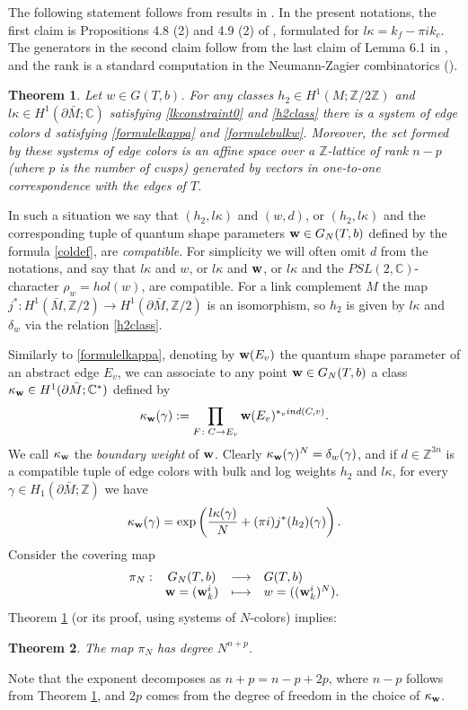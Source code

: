 \documentclass[11pt]{amsart}
\newtheorem{teo}{Theorem}[section]
\newcommand{\fonc}[5]{                     %
            \begin{array}{lcll}#1 :& #2 & \longrightarrow & #3 \\   %
                         &#4 &\longmapsto & #5          %
            \end{array}}
\newcommand{\mc}{\mathbb{C}}
\newcommand{\mz}{\mathbb{Z}}
\newcommand{\Z}{\mathbb{Z}}
\newcommand{\bw}{{\bf w}}
\newcommand{\ra}{\rightarrow}
\begin{document}
The following statement follows from results in  \cite{N0,N}. In the present notations, the first claim is Propositions 4.8 (2) and 4.9 (2) of \cite{AGT}, formulated for $l\kappa= k_f-\pi ik_c$. The generators in the second claim follow from the last claim of Lemma 6.1 in \cite{N0}, and the rank is a standard computation in the Neumann-Zagier combinatorics (\cite{NZ}). 
\begin{teo}\label{spaced} Let $w\in G(T,b)$. For any classes $h_2\in H^1(M;\mz/2\mz)$ and $l\kappa\in H^1(\partial \bar M; \mc)$ satisfying \eqref{lkconstraint0} and \eqref{h2class} there is a system of edge colors $d$ satisfying \eqref{formulelkappa} and \eqref{formulebulkw}. Moreover, the set formed by these systems of edge colors is an affine space over a $\mz$-lattice of rank $n-p$ (where $p$ is the number of cusps) generated by vectors in one-to-one correspondence with the edges of $T$.
\end{teo}
In such a situation we say that $(h_2, l\kappa)$ and $(w,d)$, or $(h_2, l\kappa)$ and the corresponding tuple of quantum shape parameters $\bw\in G_N(T,b)$ defined by the formula \eqref{coldef}, are {\it compatible}. For simplicity we will often omit $d$ from the notations, and say that $l\kappa$ and $w$, or $l\kappa$ and $\bw$, or $l\kappa$ and the $PSL(2,\mc)$-character $\rho_w = hol(w)$, are compatible.  For a link complement $M$ the map $j^*\colon H^1(\bar{M},\mz/2)\ra H^1(\partial \bar{M},\mz/2)$ is an isomorphism, so $h_2$ is given by $l\kappa$ and $\delta_w$ via the relation \eqref{h2class}.  
\smallskip

Similarly to \eqref{formulelkappa}, denoting by $\bw(E_v)$ the quantum shape parameter of an abstract edge $E_v$, we can associate to any point $\bw\in G_N(T,b)$ a class $\kappa_\bw\in H^1(\partial \bar M; \mc^*)$ defined by
\begin{equation}
 \kappa_\bw(\gamma)  := \prod_{F\colon C \ra E_v} \bw(E_v)^{*_v ind(C,v)} \label{formulekappa}.
\end{equation}
We call $\kappa_\bw$ the {\it boundary weight} of $\bw$. Clearly $\kappa_\bw(\gamma)^{N}= \delta_{w}(\gamma)$, and if $d\in \mz^{3n}$ is a compatible tuple of edge colors with bulk and log weights $h_2$ and $l\kappa$, for every $\gamma\in H_1(\partial \bar M; \Z)$ we have
\begin{equation}\kappa_\bw(\gamma)  = \exp\left(\frac{l\kappa(\gamma)}{N}+(\pi i) j^*(h_2)(\gamma)\right). \label{kappaborddef}
\end{equation}
Consider the covering map
\begin{equation}\label{coverGN}
\fonc{\pi_N}{G_N(T,b)}{G(T,b)}{\bw = (\bw_k^i)}{w = ((\bw_k^i)^N).}
\end{equation}
Theorem \ref{spaced} (or its proof, using systems of $N$-colors) implies:
\begin{teo}\label{teocoverGN} The map $\pi_N$ has degree $N^{n+p}$. 
\end{teo}
Note that the exponent decomposes as $n+p=n-p+2p$, where $n-p$ follows from Theorem  \ref{spaced}, and $2p$ comes from the degree of freedom in the choice of $\kappa_\bw$. 
\end{document}
